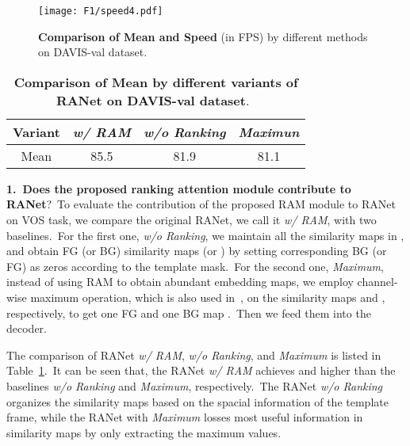 \documentclass[10pt,twocolumn,letterpaper]{article}
\begin{document}
\begin{figure}[t]\vspace{-4mm}
\begin{center}
\texttt{[image: F1/speed4.pdf]}
\end{center}
\vspace{-6mm}
\caption{\textbf{Comparison of  Mean and Speed} (in FPS) by different methods on DAVIS-val dataset.}
\vspace{-2mm}
\label{fig:speed}
\end{figure}
\begin{table}[t]
  \centering
    \begin{tabular}{c||ccc}
    \Xhline{1pt}
    \rowcolor[rgb]{ .873,  .91,  0.95} 
Variant
    & \multicolumn{1}{l}{\emph{w/ RAM}} 
    & \multicolumn{1}{l}{\emph{w/o Ranking}}
    & \multicolumn{1}{l}{\emph{Maximun}} 
\\
    \hline
 Mean & 85.5 &   81.9   & 81.1 
\\
\hline
    \end{tabular}\vspace{-3mm}
    \caption{\textbf{Comparison of  Mean by different variants of RANet on DAVIS-val dataset}.\ 
}
    \vspace{-4mm}
  \label{tab:ram}\end{table}

\noindent
\textbf{1.\ Does the proposed ranking attention module contribute to RANet}?\
To evaluate the contribution of the proposed RAM module to RANet on VOS task, we compare the original RANet, we call it \emph{w/ RAM}, with two baselines.\ For the first one, \emph{w/o Ranking}, we maintain all the similarity maps in , and obtain FG (or BG) similarity maps  (or ) by setting corresponding BG (or FG) as zeros according to the template mask.\ For the second one, \emph{Maximum}, instead of using RAM to obtain abundant embedding maps, we employ channel-wise maximum operation, which is also used in~\cite{Voigtlaender2019FEELVOS}, on the similarity maps  and , respectively, to get one FG and one BG map .\ Then we feed them into the decoder.\ 

The comparison of RANet \emph{w/ RAM}, \emph{w/o Ranking}, and \emph{Maximum} is listed in Table~\ref{tab:ram}.\ It can be seen that, the RANet \emph{w/ RAM} achieves  and  higher than the baselines \emph{w/o Ranking} and \emph{Maximum}, respectively.\ The RANet \emph{w/o Ranking} organizes the similarity maps based on the spacial information of the template frame, while the RANet with \emph{Maximum} losses most useful information in similarity maps by only extracting the maximum values.
\end{document}
